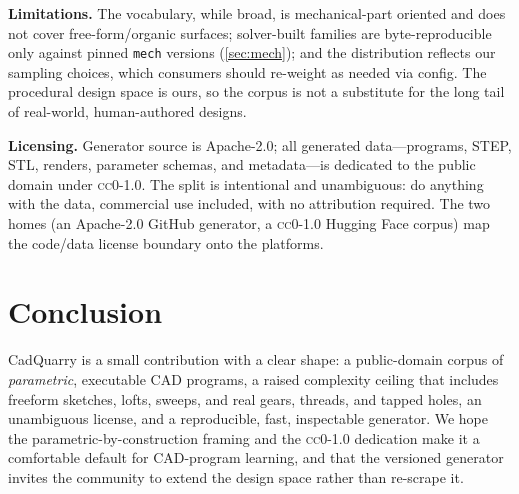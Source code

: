 \documentclass[11pt]{article}
\newcommand{\code}[1]{\texttt{#1}}
\newcommand{\cc}{\textsc{cc0-1.0}}
\newcommand{\apache}{Apache-2.0}
\begin{document}
\textbf{Limitations.} The vocabulary, while broad, is mechanical-part oriented and
does not cover free-form/organic surfaces; solver-built families are
byte-reproducible only against pinned \code{mech} versions
(\cref{sec:mech}); and the distribution reflects our sampling choices, which
consumers should re-weight as needed via config. The procedural design space is
ours, so the corpus is not a substitute for the long tail of real-world,
human-authored designs.

\textbf{Licensing.} Generator source is \apache{}; all generated
data---programs, STEP, STL, renders, parameter schemas, and metadata---is
dedicated to the public domain under \cc{}. The split is intentional and
unambiguous: do anything with the data, commercial use included, with no
attribution required. The two homes (an \apache{} GitHub generator, a \cc{}
Hugging Face corpus) map the code/data license boundary onto the platforms.

\section{Conclusion}
CadQuarry is a small contribution with a clear shape: a public-domain corpus of
\emph{parametric}, executable CAD programs, a raised complexity ceiling that
includes freeform sketches, lofts, sweeps, and real gears, threads, and tapped
holes, an unambiguous license, and a reproducible,
fast, inspectable generator. We hope the parametric-by-construction framing and
the \cc{} dedication make it a comfortable default for CAD-program learning, and
that the versioned generator invites the community to extend the design space
rather than re-scrape it.

\printbibliography
\end{document}
